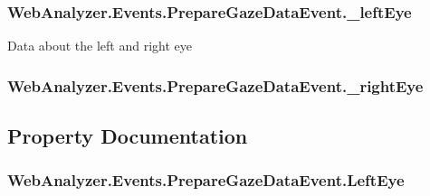 \subsubsection[{\+\_\+left\+Eye}]{ Web\+Analyzer.\+Events.\+Prepare\+Gaze\+Data\+Event.\+\_\+left\+Eye\hspace{0.3cm}{\ttfamily [private]}}\label{class_web_analyzer_1_1_events_1_1_prepare_gaze_data_event_a125f124a2790762c2fdbfae8f5f4720b}


Data about the left and right eye 

\hypertarget{class_web_analyzer_1_1_events_1_1_prepare_gaze_data_event_a1399fd88106ee9c555156c524435406e}{}
\subsubsection[{\+\_\+right\+Eye}]{ Web\+Analyzer.\+Events.\+Prepare\+Gaze\+Data\+Event.\+\_\+right\+Eye\hspace{0.3cm}{\ttfamily [private]}}\label{class_web_analyzer_1_1_events_1_1_prepare_gaze_data_event_a1399fd88106ee9c555156c524435406e}


\subsection{Property Documentation}
\hypertarget{class_web_analyzer_1_1_events_1_1_prepare_gaze_data_event_a9da235ea57d2c7496c0ef49772f93340}{}
\subsubsection[{Left\+Eye}]{ Web\+Analyzer.\+Events.\+Prepare\+Gaze\+Data\+Event.\+Left\+Eye\hspace{0.3cm}{\ttfamily [get]}}\label{class_web_analyzer_1_1_events_1_1_prepare_gaze_data_event_a9da235ea57d2c7496c0ef49772f93340}


